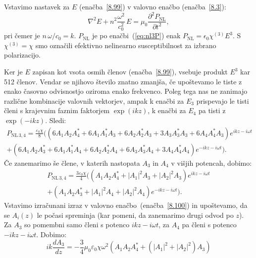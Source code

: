 Vstavimo nastavek za $E$ (enačba~\ref{8.99}) v valovno enačbo (enačba~\ref{8.3}):
\begin{equation}
\nabla^{2}E+n^2\frac{\omega^{2}}{c_0^{2}}\, 
E=\mu_{0}\frac{\partial^2 P_{\mathrm{NL}}}{\partial t^2},
\label{8.100}
\end{equation}
pri čemer je $n\,\omega/c_0=k$. $P_{\textrm{NL}}$ je po enačbi~(\ref{eq:nl3P})
enak $P_\mathrm{NL}= \epsilon_{0}\chi^{(3)}E^3$. S $\chi^{(3)} = \chi$ smo označili
efektivno nelinearno susceptibilnost
za izbrano polarizacijo. 

Ker je $E$ zapisan kot vsota osmih členov
(enačba~\ref{8.99}), vsebuje produkt $E^3$ kar 512 členov. Vendar se njihovo število znatno zmanjša, 
če upoštevamo le tiste z enako časovno odvisnostjo oziroma enako frekvenco.
Poleg tega nas ne zanimajo različne kombinacije valovnih vektorjev, ampak k enačbi za $E_{3}$ 
prispevajo le tisti členi s krajevnim faznim faktorjem $\exp(ikz)$, 
k enačbi za $E_4$ pa tisti z $\exp(-ikz)$. Sledi:
\begin{equation}
\begin{split}
P_{\mathrm{NL}\,3,4} = \frac{\varepsilon_0\chi}{8} \big(
\left(6 A_1 A_2 A_4^*+ 6A_1 A_1^*A_3 + 6A_2A_2^*A_3 + 3 A_3A_3^*A_3 + 6 A_4 A_4^* A_3\right)
e^{i k z - i\omega t} \\
+
\left(6 A_1 A_2 A_3^*+6 A_1 A_1^*A_4 + 6A_2A_2^*A_4 + 6 A_3A_3^*A_4 + 3 A_4 A_4^* A_4\right)
e^{-i k z - i\omega t} \big).
\end{split}
\end{equation}
Če zanemarimo še člene, v katerih nastopata $A_3$ in $A_4$ v višjih potencah, dobimo:
\begin{equation}
\begin{split}
P_{\mathrm{NL}\,3,4} = \frac{3\varepsilon_0\chi}{4} \big(
\left( A_1 A_2 A_4^*+ |A_1|^2 A_3 + |A_2|^2 A_3 \right)
e^{i k z - i\omega t} \\
+ 
\left( A_1 A_2 A_3^*+|A_1|^2 A_4 + |A_2|^2A_4 \right)
e^{-i k z - i\omega t} \big).
\end{split}
\end{equation}
Vstavimo izračunani izraz v valovno enačbo~(enačba~\ref{8.100}) in upoštevamo, 
da se $A_i(z)$ le počasi 
spreminja (kar pomeni, da zanemarimo drugi odvod po $z$). Za $A_3$ so pomembni 
samo členi s potenco $ikz-i\omega t$, za $A_4$ pa členi s potenco $-ikz-i\omega t$. Dobimo: 
\begin{equation}
i k \frac{dA_3}{dz} = - \frac{3}{4} \mu_0\varepsilon_0 \chi \omega^2 
\left( A_1 A_2 A_4^*+ (|A_1|^2 + |A_2|^2) A_3 \right)
\label{eq:opc1}
\end{equation}
